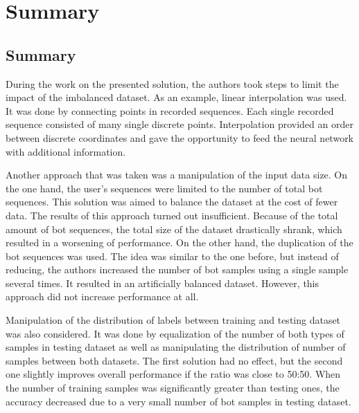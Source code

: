 \chapter{Summary}\label{ch:summary}

\section{Summary}\label{sec:summary}
During the work on the presented solution, the authors took steps to limit the impact of the imbalanced dataset.
As an example, linear interpolation was used.
It was done by connecting points in recorded sequences.
Each single recorded sequence consisted of many single discrete points.
Interpolation provided an order between discrete coordinates and gave the opportunity to feed the neural network with additional information.

Another approach that was taken was a manipulation of the input data size.
On the one hand, the user's sequences were limited to the number of total bot sequences.
This solution was aimed to balance the dataset at the cost of fewer data.
The results of this approach turned out insufficient.
Because of the total amount of bot sequences, the total size of the dataset drastically shrank, which resulted in a worsening of performance.
On the other hand, the duplication of the bot sequences was used.
The idea was similar to the one before, but instead of reducing, the authors increased the number of bot samples using a single sample several times.
It resulted in an artificially balanced dataset.
However, this approach did not increase performance at all.

Manipulation of the distribution of labels between training and testing dataset was also considered.
It was done by equalization of the number of both types of samples in testing dataset as well as manipulating the distribution of number of samples between both datasets.
The first solution had no effect, but the second one slightly improves overall performance if the ratio was close to \num{50}:\num{50}.
When the number of training samples was significantly greater than testing ones, the accuracy decreased due to a very small number of bot samples in testing dataset.

